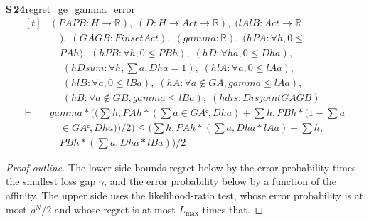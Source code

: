 \documentclass[conference]{IEEEtran}
\theoremstyle{definition}
\newcommand{\lean}[1]{\textsf{\footnotesize #1}}
\begin{document}
\noindent\textbf{S\,24}\quad\lean{regret\_ge\_gamma\_error}
{\footnotesize\[ \begin{aligned}[t]
&(\mathit{PA} \mathit{PB} : \mathit{H} \to \mathbb{R} ),\; (\mathit{D} : \mathit{H} \to \mathit{Act} \to \mathbb{R} ),\; (\mathit{lA} \mathit{lB} : \mathit{Act} \to \mathbb{R}\\
&\quad ),\; (\mathit{GA} \mathit{GB} : \mathit{Finset} \mathit{Act}),\; (\mathit{gamma} : \mathbb{R} ),\; (\mathit{hPA} : \forall \mathit{h}, 0 \leq\\
&\quad \mathit{PA} \mathit{h}),\; (\mathit{hPB} : \forall \mathit{h}, 0 \leq \mathit{PB} \mathit{h}),\; (\mathit{hD} : \forall \mathit{h} \mathit{a}, 0 \leq \mathit{D} \mathit{h} \mathit{a}),\\
&\quad \; (\mathit{hDsum} : \forall \mathit{h}, \textstyle\sum \mathit{a}, \mathit{D} \mathit{h} \mathit{a} = 1),\; (\mathit{hlA} : \forall \mathit{a}, 0 \leq \mathit{lA} \mathit{a}),\\
&\quad \; (\mathit{hlB} : \forall \mathit{a}, 0 \leq \mathit{lB} \mathit{a}),\; (\mathit{hA} : \forall \mathit{a} \notin \mathit{GA}, \mathit{gamma} \leq \mathit{lA} \mathit{a}),\\
&\quad \; (\mathit{hB} : \forall \mathit{a} \notin \mathit{GB}, \mathit{gamma} \leq \mathit{lB} \mathit{a}),\; (\mathit{hdis} : \mathit{Disjoint} \mathit{GA} \mathit{GB})\\
\vdash\;&\mathit{gamma} * ((\textstyle\sum \mathit{h}, \mathit{PA} \mathit{h} * (\textstyle\sum \mathit{a} \in \mathit{GAᶜ}, \mathit{D} \mathit{h} \mathit{a}) + \textstyle\sum \mathit{h}, \mathit{PB} \mathit{h} * (1 - \textstyle\sum \mathit{a}\\
&\quad \in \mathit{GAᶜ}, \mathit{D} \mathit{h} \mathit{a})) / 2) \leq (\textstyle\sum \mathit{h}, \mathit{PA} \mathit{h} * (\textstyle\sum \mathit{a}, \mathit{D} \mathit{h} \mathit{a} * \mathit{lA} \mathit{a}) + \textstyle\sum \mathit{h},\\
&\quad \mathit{PB} \mathit{h} * (\textstyle\sum \mathit{a}, \mathit{D} \mathit{h} \mathit{a} * \mathit{lB} \mathit{a})) / 2
\end{aligned} \]}


\begin{proof}[Proof outline]
The lower side bounds regret below by the error probability times the smallest loss gap
$\gamma$, and the error probability below by a function of the affinity. The upper side uses
the likelihood-ratio test, whose error probability is at most $\rho^{N}/2$ and whose regret
is at most $L_{\max}$ times that.
\end{proof}
\end{document}
